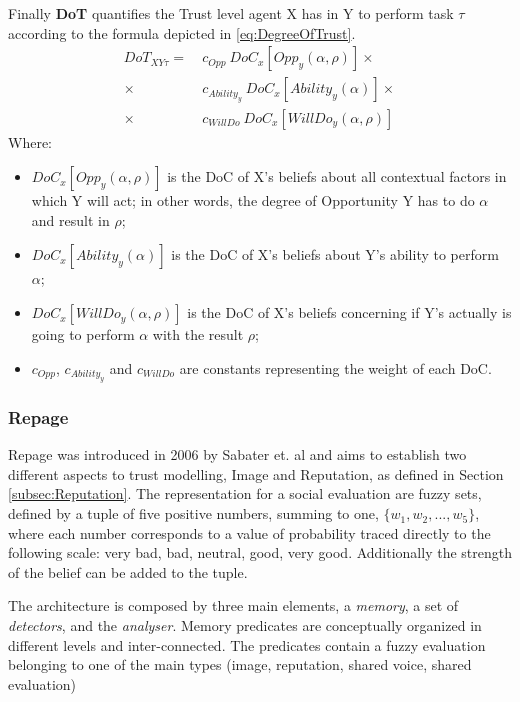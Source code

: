 Finally \textbf{\ac{DoT}} quantifies the Trust level agent X has in Y to perform task $\tau$ according to the formula depicted in \ref{eq:DegreeOfTrust}.
\begin{equation}
	\begin{aligned}
		DoT_{XY\tau} =\ &c_{Opp}\ DoC_x[Opp_y(\alpha, \rho)] \times\\
					    \times\ &c_{Ability_y}\ DoC_x[Ability_y(\alpha)]\times \\
					    \times\ &c_{WillDo}\ DoC_x[WillDo_y(\alpha, \rho)]
	\end{aligned}
	\label{eq:DegreeOfTrust}
\end{equation}
Where:
\begin{itemize}
	\item $DoC_x[Opp_y(\alpha, \rho)]$ is the \ac{DoC} of X's beliefs about all contextual factors in which Y will act; in other words, the degree of Opportunity Y has to do $\alpha$ and result in $\rho$;
	\item $DoC_x[Ability_y(\alpha)]$ is the \ac{DoC} of X's beliefs about Y's ability to perform $\alpha$;
	\item $DoC_x[WillDo_y(\alpha, \rho)]$ is the \ac{DoC} of X's beliefs concerning if Y's actually is going to perform $\alpha$ with the result $\rho$;
	\item $c_{Opp}$, $c_{Ability_y}$ and $c_{WillDo}$ are constants representing the weight of each \ac{DoC}.
\end{itemize}


\subsubsection{Repage}
\label{subsubsec:Related work:Trust Models:Repage}
Repage was introduced in 2006 by Sabater et. al\cite{Sabater2006} and aims to establish two different aspects to trust modelling, Image and Reputation, as defined in Section \ref{subsec:Reputation}. The representation for a social evaluation are fuzzy sets, defined by a tuple of five positive numbers, summing to one, $\{w_1, w_2, ..., w_5\}$, where each number corresponds to a value of probability traced directly to the following scale: very bad, bad, neutral, good, very good. Additionally the strength of the belief can be added to the tuple.

The architecture is composed by three main elements, a \textit{memory}, a set of \textit{detectors}, and the \textit{analyser}. Memory predicates are conceptually organized in different levels and inter-connected. The predicates contain a fuzzy evaluation belonging to one of the main types (image, reputation, shared voice, shared evaluation)






